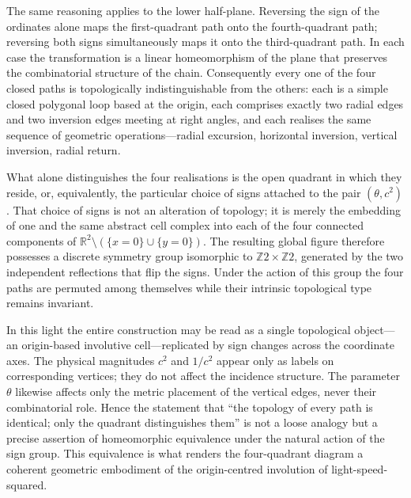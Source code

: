 The same reasoning applies to the lower half-plane. Reversing the sign of the ordinates alone maps the first-quadrant path onto the fourth-quadrant path; reversing both signs simultaneously maps it onto the third-quadrant path. In each case the transformation is a linear homeomorphism of the plane that preserves the combinatorial structure of the chain. Consequently every one of the four closed paths is topologically indistinguishable from the others: each is a simple closed polygonal loop based at the origin, each comprises exactly two radial edges and two inversion edges meeting at right angles, and each realises the same sequence of geometric operations—radial excursion, horizontal inversion, vertical inversion, radial return.

What alone distinguishes the four realisations is the open quadrant in which they reside, or, equivalently, the particular choice of signs attached to the pair \((\theta,c^{2})\). That choice of signs is not an alteration of topology; it is merely the embedding of one and the same abstract cell complex into each of the four connected components of \(\mathbb{R}^{2}\setminus(\{x=0\}\cup\{y=0\})\). The resulting global figure therefore possesses a discrete symmetry group isomorphic to \(\mathbb{Z}{2}\times\mathbb{Z}{2}\), generated by the two independent reflections that flip the signs. Under the action of this group the four paths are permuted among themselves while their intrinsic topological type remains invariant.

In this light the entire construction may be read as a single topological object—an origin-based involutive cell—replicated by sign changes across the coordinate axes. The physical magnitudes \(c^{2}\) and \(1/c^{2}\) appear only as labels on corresponding vertices; they do not affect the incidence structure. The parameter \(\theta\) likewise affects only the metric placement of the vertical edges, never their combinatorial role. Hence the statement that “the topology of every path is identical; only the quadrant distinguishes them” is not a loose analogy but a precise assertion of homeomorphic equivalence under the natural action of the sign group. This equivalence is what renders the four-quadrant diagram a coherent geometric embodiment of the origin-centred involution of light-speed-squared.
